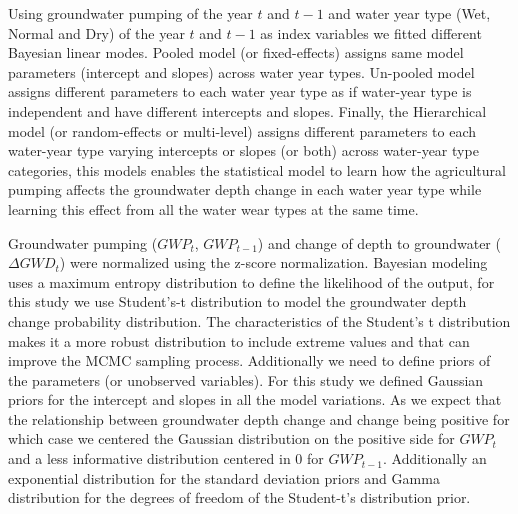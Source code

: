 \documentclass[11pt,a4paper]{article}
\begin{document}
Using groundwater pumping of the year $t$ and $t-1$ and water year type (Wet, Normal and Dry) of the year $t$ and $t-1$ as index variables we fitted different Bayesian linear modes. Pooled model (or fixed-effects) assigns same model parameters (intercept and slopes) across water year types. Un-pooled model assigns different parameters to each water year type as if water-year type is independent and have different intercepts and slopes. Finally, the Hierarchical model (or random-effects or multi-level) assigns different parameters to each water-year type varying intercepts or slopes (or both) across water-year type categories, this models enables the statistical model to learn how the agricultural pumping affects the groundwater depth change in each water year type while learning this effect from all the water wear types at the same time. 

Groundwater pumping ($GWP_{t}$, $GWP_{t-1}$) and change of depth to groundwater ($\Delta{GWD}_t$) were normalized using the z-score normalization. Bayesian modeling uses a maximum entropy distribution to define the likelihood of the output, for this study we use Student's-t distribution to model the groundwater depth change probability distribution. The characteristics of the Student's t distribution makes it a more robust distribution to include extreme values and that can improve the MCMC sampling process. Additionally we need to define priors of the parameters (or unobserved variables). For this study we defined Gaussian priors for the intercept and slopes in all the model variations. As we expect that the relationship between groundwater depth change and change being positive for which case we centered the Gaussian distribution on the positive side for ${GWP}_t$ and a less informative distribution centered in 0 for ${GWP}_{t-1}$. Additionally an exponential distribution for the standard deviation priors  and Gamma distribution for the degrees of freedom of the Student-t's distribution prior. 
\end{document}
